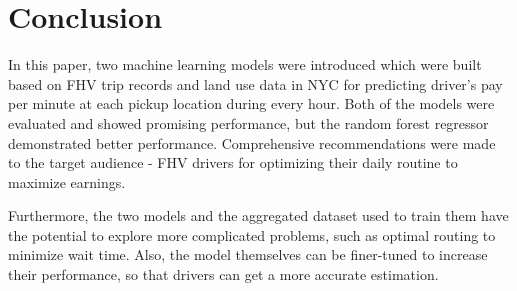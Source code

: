\documentclass[11pt]{article}
\begin{document}
\section{Conclusion}
In this paper, two machine learning models were introduced which were built based on FHV trip records and land use data in NYC for predicting driver's pay per minute at each pickup location during every hour. Both of the models were evaluated and showed promising performance, but the random forest regressor demonstrated better performance. Comprehensive recommendations were made to the target audience - FHV drivers for optimizing their daily routine to maximize earnings. 

Furthermore, the two models and the aggregated dataset used to train them have the potential to explore more complicated problems, such as optimal routing to minimize wait time. Also, the model themselves can be finer-tuned to increase their performance, so that drivers can get a more accurate estimation. 



\clearpage

\printbibliography
\end{document}
